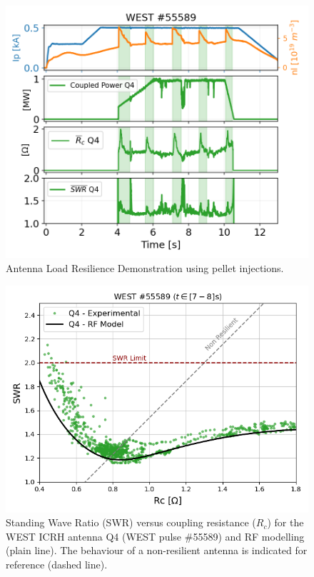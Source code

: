 \documentclass[12p]{iopart}
\begin{document}
\begin{figure}
	\centering
	\includegraphics[width=0.95\linewidth]{figures/WEST_IC_55589_summary_pellet}
	\caption{Antenna Load Resilience Demonstration using pellet injections.}
	\label{fig:westic55589summarypellet}
\end{figure}

\begin{figure}
	\centering
	\includegraphics[width=0.95\linewidth]{figures/WEST_ICRH_55589_load_resilience_Q4}
	\caption{Standing Wave Ratio (SWR) versus coupling resistance ($R_c$) for the WEST ICRH antenna Q4 (WEST pulse \#55589) and RF modelling (plain line). The behaviour of a non-resilient antenna is indicated for reference (dashed line). }
	\label{fig:westicrh55589loadresilienceq4}
\end{figure}
\end{document}
